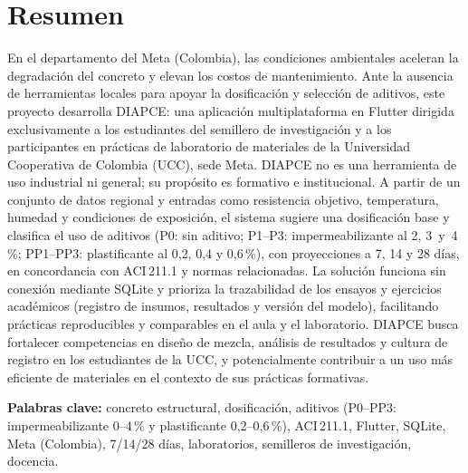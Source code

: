 \section*{Resumen}

En el departamento del Meta (Colombia), las condiciones ambientales aceleran la degradación del concreto y elevan los costos de mantenimiento. Ante la ausencia de herramientas locales para apoyar la dosificación y selección de aditivos, este proyecto desarrolla DIAPCE: una aplicación multiplataforma en Flutter dirigida exclusivamente a los estudiantes del semillero de investigación y a los participantes en prácticas de laboratorio de materiales de la Universidad Cooperativa de Colombia (UCC), sede Meta. DIAPCE no es una herramienta de uso industrial ni general; su propósito es formativo e institucional. A partir de un conjunto de datos regional y entradas como resistencia objetivo, temperatura, humedad y condiciones de exposición, el sistema sugiere una dosificación base y clasifica el uso de aditivos (P0: sin aditivo; P1--P3: impermeabilizante al 2, 3~y~4\,\%; PP1--PP3: plastificante al 0{,}2, 0{,}4 y 0{,}6\,\%), con proyecciones a 7, 14 y 28 días, en concordancia con ACI\,211.1 y normas relacionadas. La solución funciona sin conexión mediante SQLite y prioriza la trazabilidad de los ensayos y ejercicios académicos (registro de insumos, resultados y versión del modelo), facilitando prácticas reproducibles y comparables en el aula y el laboratorio. DIAPCE busca fortalecer competencias en diseño de mezcla, análisis de resultados y cultura de registro en los estudiantes de la UCC, y potencialmente contribuir a un uso más eficiente de materiales en el contexto de sus prácticas formativas.

\vspace{0.5em}
\noindent\textbf{Palabras clave:} concreto estructural, dosificación, aditivos (P0--PP3: impermeabilizante 0--4\,\% y plastificante 0{,}2--0{,}6\,\%), ACI\,211.1, Flutter, SQLite, Meta (Colombia), 7/14/28 días, laboratorios, semilleros de investigación, docencia.
